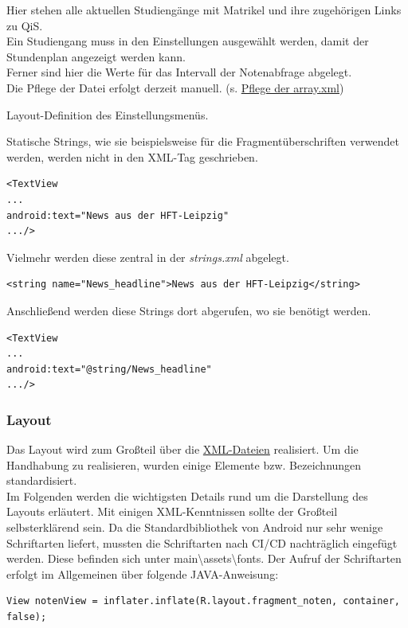 \begin{description}
Hier stehen alle aktuellen Studiengänge mit Matrikel und ihre zugehörigen Links zu QiS.\\
Ein Studiengang muss in den Einstellungen ausgewählt werden, damit der Stundenplan angezeigt werden kann.\\
Ferner sind hier die Werte für das Intervall der Notenabfrage abgelegt.\\
Die Pflege der Datei erfolgt derzeit manuell. (s. \hyperref[pflege]{Pflege der array.xml})

Layout-Definition des Einstellungsmenüs.

Statische Strings, wie sie beispielsweise für die Fragmentüberschriften verwendet werden, werden nicht in den XML-Tag geschrieben. 
\lstset{language=XML}
\begin{lstlisting}
<TextView
...
android:text="News aus der HFT-Leipzig"
.../>
\end{lstlisting}

Vielmehr werden diese zentral in der \textit{strings.xml} abgelegt.

\begin{lstlisting}[caption={Ablage in strings.xml}]
<string name="News_headline">News aus der HFT-Leipzig</string>
\end{lstlisting}

Anschließend werden diese Strings dort abgerufen, wo sie benötigt werden. 

\begin{lstlisting}[caption={Aufruf im fragment.xml}]
<TextView
...
android:text="@string/News_headline"
.../>
\end{lstlisting}



\newpage
\subsubsection{Layout}
Das Layout wird zum Großteil über die \hyperref[XML]{XML-Dateien} realisiert. Um die Handhabung zu realisieren, wurden einige Elemente bzw. Bezeichnungen standardisiert.\\ Im Folgenden werden die wichtigsten Details rund um die Darstellung des Layouts erläutert. Mit einigen XML-Kenntnissen sollte der Großteil selbsterklärend sein.
\label{Schriftarten}
Da die Standardbibliothek von Android nur sehr wenige Schriftarten liefert, mussten die Schriftarten nach CI/CD nachträglich eingefügt werden. Diese befinden sich unter main\textbackslash{assets}\textbackslash{fonts}.
Der Aufruf der Schriftarten erfolgt im Allgemeinen über folgende JAVA-Anweisung:
\lstset{language=JAVA}
\begin{lstlisting}[caption={Beispiel: Einbinden der Schriftart Ocra im Notenfragment}]
View notenView = inflater.inflate(R.layout.fragment_noten, container, false);


\end{lstlisting}
\end{description}
